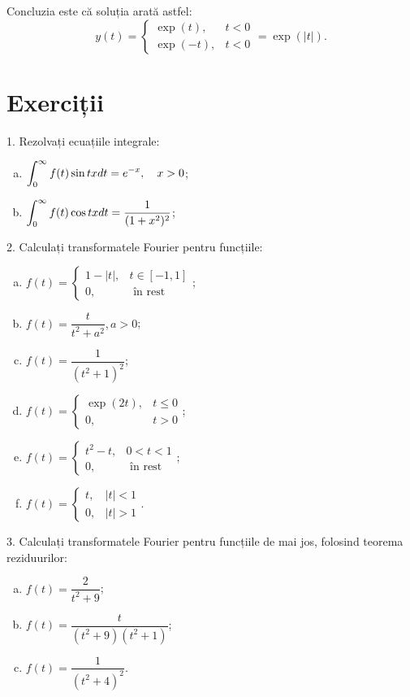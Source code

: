 Concluzia este că soluția arată astfel:
\[
  y(t) = \begin{cases}
    \exp(t), & t < 0 \\
    \exp(-t), & t < 0
  \end{cases} = \exp\left(|t|\right).  
\]


\section{Exerciții}

1. Rezolvați ecuațiile integrale:
\begin{enumerate}[(a)]
\item $ \displaystyle\int_0^\infty f(t) \sin tx dt = e^{-x}, \quad x > 0 $;
\item $ \displaystyle\int_0^\infty f(t) \cos tx dt = \dfrac{1}{(1 + x^2)^2} $;
\end{enumerate}

\vspace{0.3cm}

2. Calculați transformatele Fourier pentru funcțiile:
\begin{enumerate}[(a)]
\item $ f(t) = \begin{cases} 1 - |t|, & t \in [-1, 1] \\ 0, & \text{ în rest} \end{cases} $;
\item $ f(t) = \dfrac{t}{t^2 + a^2}, a > 0 $;
\item $ f(t) = \dfrac{1}{(t^2 + 1)^2} $;
\item $ f(t) = \begin{cases} \exp(2t), & t \leq 0 \\ 0, & t > 0 \end{cases} $;
\item $ f(t) = \begin{cases} t^2 - t, & 0 < t < 1 \\ 0, & \text{ în rest} \end{cases} $;
\item $ f(t) = \begin{cases} t, & |t| < 1 \\ 0, & |t| > 1 \end{cases} $.
\end{enumerate}

\vspace{0.3cm}

3. Calculați transformatele Fourier pentru funcțiile de mai jos,
folosind teorema reziduurilor:
\begin{enumerate}[(a)]
\item $ f(t) = \dfrac{2}{t^2 + 9} $;
\item $ f(t) = \dfrac{t}{(t^2 + 9)(t^2 + 1)} $;
\item $ f(t) = \dfrac{1}{(t^2 + 4)^2} $.
\end{enumerate}

